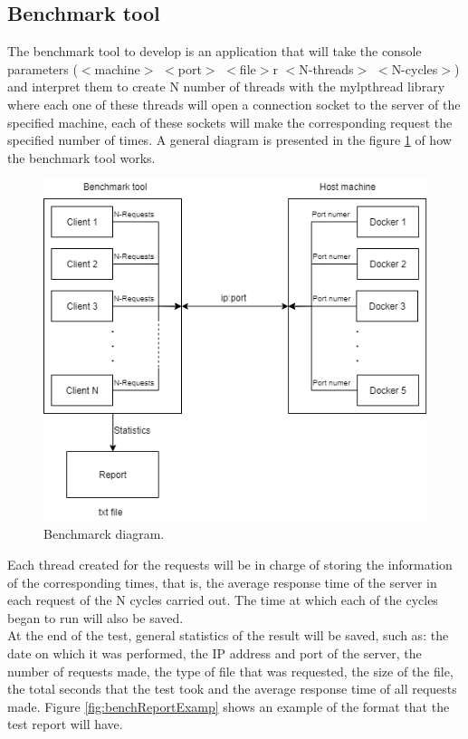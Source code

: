 \documentclass{article}
\begin{document}
\subsection{Benchmark tool}
The benchmark tool to develop is an application that will take the console parameters ($<$machine$>$ $<$port$>$ $<$file$>$r $<$N-threads$>$ $<$N-cycles$>$) and interpret them to create N number of threads with the mylpthread library where each one of these threads will open a connection socket to the server of the specified machine, each of these sockets will make the corresponding request the specified number of times. A general diagram is presented in the figure \ref{fig:BenchMarkDiagram} of how the benchmark tool works.\\
\begin{figure}[H]
	\centering
	\captionsetup{justification=centering, margin=1cm}
    \includegraphics[width=\columnwidth]{BenchMarkDiagram.png}
    \caption{Benchmarck diagram.}
	\label{fig:BenchMarkDiagram}
\end{figure}
Each thread created for the requests will be in charge of storing the information of the corresponding times, that is, the average response time of the server in each request of the N cycles carried out. The time at which each of the cycles began to run will also be saved.\\
At the end of the test, general statistics of the result will be saved, such as: the date on which it was performed, the IP address and port of the server, the number of requests made, the type of file that was requested, the size of the file, the total seconds that the test took and the average response time of all requests made. Figure \ref{fig:benchReportExamp} shows an example of the format that the test report will have.\\
\end{document}
